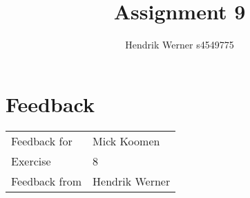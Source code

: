 \documentclass[12pt, a4paper]{article}
\title{Assignment 9}
\author{Hendrik Werner s4549775}
\begin{document}
\maketitle

\clearpage
\section{Feedback}

\begin{tabular}{ll}
	Feedback for & Mick Koomen\\
	Exercise & 8\\
	Feedback from & Hendrik Werner\\
\end{tabular}
\end{document}
